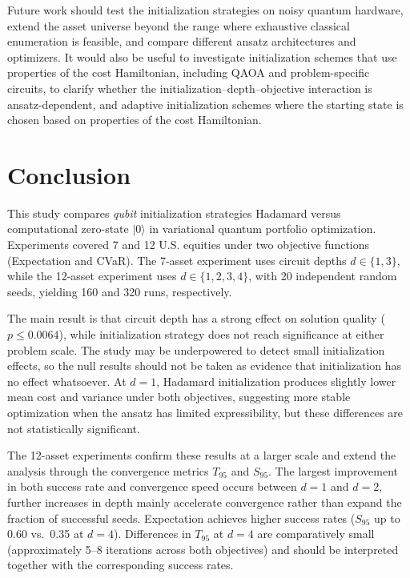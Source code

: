 \documentclass[runningheads]{llncs}
\begin{document}
Future work should test the initialization strategies on noisy quantum hardware, extend the asset universe beyond the range where exhaustive classical enumeration is feasible, and compare different ansatz architectures and optimizers. It would also be useful to investigate initialization schemes that use properties of the cost Hamiltonian, including QAOA and problem-specific circuits, to clarify whether the initialization--depth--objective interaction is ansatz-dependent, and adaptive initialization schemes where the starting state is chosen based on properties of the cost Hamiltonian.
\section{Conclusion}\label{conclusion}

This study compares \emph{qubit} initialization strategies Hadamard \cite{nielsen2010} versus computational zero-state $|0\rangle$ in variational quantum portfolio optimization. Experiments covered 7 and 12 U.S. equities under two objective functions (Expectation and CVaR). The 7-asset experiment uses circuit depths $d \in \{1,3\}$, while the 12-asset experiment uses $d \in \{1,2,3,4\}$, with 20 independent random seeds, yielding 160 and 320 runs, respectively.

The main result is that circuit depth has a strong effect on solution quality ($p \leq 0.0064$), while initialization strategy does not reach significance at either problem scale. The study may be underpowered to detect small initialization effects, so the null results should not be taken as evidence that initialization has no effect whatsoever. At $d = 1$, Hadamard initialization produces slightly lower mean cost and variance under both objectives, suggesting more stable optimization when the ansatz has limited expressibility, but these differences are not statistically significant.

The 12-asset experiments confirm these results at a larger scale and extend the analysis through the convergence metrics $T_{95}$ and $S_{95}$. The largest improvement in both success rate and convergence speed occurs between $d = 1$ and $d = 2$, further increases in depth mainly accelerate convergence rather than expand the fraction of successful seeds. Expectation achieves higher success rates ($S_{95}$ up to 0.60 vs.\ 0.35 at $d = 4$). Differences in $T_{95}$ at $d = 4$ are comparatively small (approximately 5--8 iterations across both objectives) and should be interpreted together with the corresponding success rates.
\end{document}
